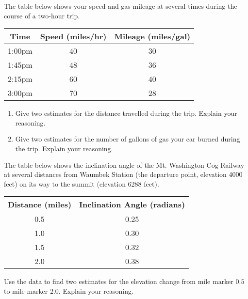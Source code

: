 \documentclass{ximera}
\begin{document}
\begin{exercise}  \label{EX:JJndre344adf}
The table below shows your speed and gas mileage at several times during the course of a two-hour trip.

\begin{tabular}{|c|c|c|}
\hline
Time & Speed (miles/hr) & Mileage (miles/gal) \\
\hline
1:00pm & 40 & 30 \\  \hline
1:45pm & 48 & 36 \\  \hline
2:15pm & 60 & 40 \\ \hline
3:00pm & 70 & 28 \\
\hline
\end{tabular}

\begin{enumerate}

\item Give two estimates for the distance travelled during the trip. Explain your reasoning.

\item Give two estimates for the number of gallons of gas your car burned during the trip. Explain your reasoning.

\end{enumerate}
\end{exercise}

\begin{exercise}  \label{EX:MnVWeDF3x}
The table below shows the inclination angle of the Mt. Washington Cog Railway at several distances from Waumbek Station (the departure point, elevation 4000 feet) on its way to the summit (elevation 6288 feet).

\begin{tabular}{|c|c|}
\hline
Distance (miles) & Inclination Angle (radians) \\
\hline
0.5 & 0.25 \\  \hline
1.0 & 0.30 \\ \hline
1.5 & 0.32 \\ \hline
2.0 & 0.38  \\ \hline
\hline
\end{tabular}

Use the data to find two estimates for the elevation change from mile marker $0.5$ to mile marker $2.0$. Explain your reasoning.
\end{exercise}
\end{document}
